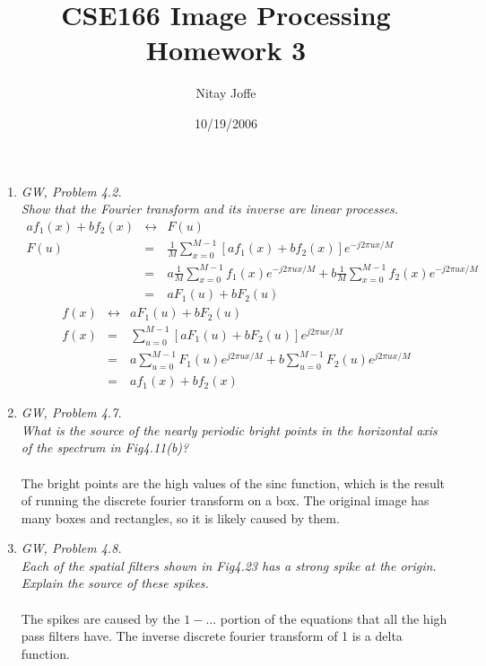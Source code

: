 \documentclass{article}
\title{CSE166 Image Processing Homework 3}
\author{Nitay Joffe}
\date{10/19/2006}
\begin{document}
  \maketitle

  \begin{enumerate}
    \item \textit{GW, Problem 4.2.\\
    Show that the Fourier transform and its inverse are linear processes.}
    \begin{eqnarray*}
      af_1(x)+bf_2(x) &\longleftrightarrow & F(u)\\
      F(u) &=& \frac{1}{M}\sum_{x=0}^{M-1}[af_1(x)+bf_2(x)]e^{-j2\pi ux/M}\\
           &=& a\frac{1}{M}\sum_{x=0}^{M-1}f_1(x)e^{-j2\pi ux/M} +
               b\frac{1}{M}\sum_{x=0}^{M-1}f_2(x)e^{-j2\pi ux/M}\\
           &=& aF_1(u) + bF_2(u)
    \end{eqnarray*}
    \begin{eqnarray*}
      f(x) &\longleftrightarrow & aF_1(u)+bF_2(u)\\
      f(x) &=& \sum_{u=0}^{M-1}[aF_1(u)+bF_2(u)]e^{j2\pi ux/M}\\
           &=& a\sum_{u=0}^{M-1}F_1(u)e^{j2\pi ux/M} +
               b\sum_{u=0}^{M-1}F_2(u)e^{j2\pi ux/M}\\
           &=& af_1(x) + bf_2(x)
    \end{eqnarray*}

    \item \textit{GW, Problem 4.7.\\
    What is the source of the nearly periodic bright points in the horizontal
    axis of the spectrum in Fig4.11(b)?}\\
    \\
    The bright points are the high values of the sinc function, which is the
    result of running the discrete fourier transform on a box. The original
    image has many boxes and rectangles, so it is likely caused by them.\\

    \item \textit{GW, Problem 4.8.\\
    Each of the spatial filters shown in Fig4.23 has a strong spike at the
    origin. Explain the source of these spikes.}\\
    \\
    The spikes are caused by the $1-...$ portion of the equations that all the
    high pass filters have. The inverse discrete fourier transform of 1 is
    a delta function.\\


\end{enumerate}
\end{document}
